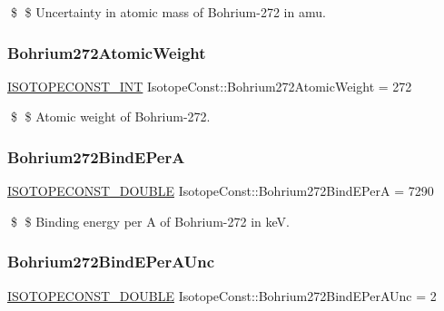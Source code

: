 \$ \$ Uncertainty in atomic mass of Bohrium-\/272 in amu. \mbox{\label{group___isotope_const-_bohrium-_bh272_gad6d9999806c65bb8ffe844b9190bac12}} 
\subsubsection{\texorpdfstring{Bohrium272\+Atomic\+Weight}{Bohrium272AtomicWeight}}
{\footnotesize\ttfamily \mbox{\hyperlink{group___isotope_const-_macros_ga5f18360b3e99483a35c32d789e62621c}{I\+S\+O\+T\+O\+P\+E\+C\+O\+N\+S\+T\+\_\+\+I\+NT}} Isotope\+Const\+::\+Bohrium272\+Atomic\+Weight = 272}

\$ \$ Atomic weight of Bohrium-\/272. \mbox{\label{group___isotope_const-_bohrium-_bh272_ga90c3a067016a2586f739fd08b12f9c0d}} 
\subsubsection{\texorpdfstring{Bohrium272\+Bind\+E\+PerA}{Bohrium272BindEPerA}}
{\footnotesize\ttfamily \mbox{\hyperlink{group___isotope_const-_macros_ga8f45a7272ce02c0b4c65c44636ed719a}{I\+S\+O\+T\+O\+P\+E\+C\+O\+N\+S\+T\+\_\+\+D\+O\+U\+B\+LE}} Isotope\+Const\+::\+Bohrium272\+Bind\+E\+PerA = 7290}

\$ \$ Binding energy per A of Bohrium-\/272 in keV. \mbox{\label{group___isotope_const-_bohrium-_bh272_ga53c18342f512250a88ed082e0bbe601f}} 
\subsubsection{\texorpdfstring{Bohrium272\+Bind\+E\+Per\+A\+Unc}{Bohrium272BindEPerAUnc}}
{\footnotesize\ttfamily \mbox{\hyperlink{group___isotope_const-_macros_ga8f45a7272ce02c0b4c65c44636ed719a}{I\+S\+O\+T\+O\+P\+E\+C\+O\+N\+S\+T\+\_\+\+D\+O\+U\+B\+LE}} Isotope\+Const\+::\+Bohrium272\+Bind\+E\+Per\+A\+Unc = 2}

